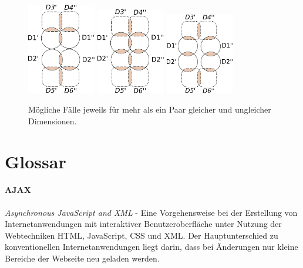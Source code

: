 \documentclass[11pt]{article}
\begin{document}
\begin{figure}[!htb]
%
    \centering
  \includegraphics[width=3cm]{CaseDifferentiation/CaseDifferentiation_2SameDim_4DimSomeDePairPartnered_4ChainingWith2ForeignDim2.pdf}
  \label{}
\endminipage
{}
    \centering
    \includegraphics[width=3cm]{CaseDifferentiation/CaseDifferentiation_2SameDim_6DimSomeDePairPartnered_3Circle.pdf}
  \label{}
\endminipage\hfill
{}%
    \centering
  \includegraphics[width=3cm]{CaseDifferentiation/CaseDifferentiation_2SameDim_6DimSomeDePairPartnered_Circle.pdf}
  \label{}
\endminipage
    \caption{Mögliche Fälle jeweils für mehr als ein Paar gleicher und ungleicher Dimensionen.}
\end{figure}

%
%
\clearpage
\newpage
\section{Glossar}

\paragraph{AJAX} \textit{Asynchronous JavaScript and XML} - Eine Vorgehensweise bei der Erstellung von Internetanwendungen mit interaktiver Benutzeroberfläche unter Nutzung der Webtechniken HTML, JavaScript, CSS und XML. Der Hauptunterschied zu konventionellen Internetanwendungen liegt darin, dass bei Änderungen nur kleine Bereiche der Webseite neu geladen werden. \cite[S. 38]{AJAX}
\end{document}
